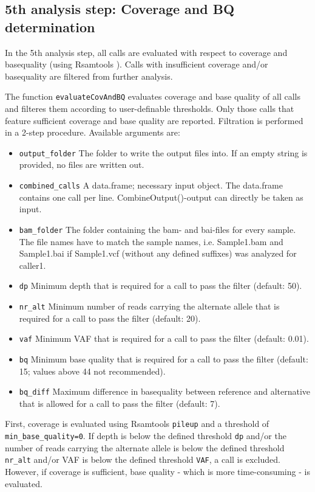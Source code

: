 \documentclass{article}
\begin{document}
\subsection{5th analysis step: Coverage and BQ determination}

In the 5th analysis step, all calls are evaluated with respect to coverage and basequality (using Rsamtools \cite{rsamtools}). Calls with insufficient coverage and/or basequality are filtered from further analysis.

The function \texttt{evaluateCovAndBQ} evaluates coverage and base quality of all calls and filteres them according to user-definable thresholds. Only those calls that feature sufficient coverage and base quality are reported. Filtration is performed in a 2-step procedure. Available arguments are:

\begin{itemize}
  \item \texttt{output\_folder} The folder to write the output files into. If an empty string is provided, no files are written out.
  \item \texttt{combined\_calls} A data.frame; necessary input object. The data.frame contains one call per line. CombineOutput()-output can directly be taken as input.
  \item \texttt{bam\_folder} The folder containing the bam- and bai-files for every sample. The file names have to match the sample names, i.e. Sample1.bam and Sample1.bai if Sample1.vcf (without any defined suffixes) was analyzed for caller1.
  \item \texttt{dp} Minimum depth that is required for a call to pass the filter (default: 50).
  \item \texttt{nr\_alt} Minimum number of reads carrying the alternate allele that is required for a call to pass the filter (default: 20).
  \item \texttt{vaf} Minimum VAF that is required for a call to pass the filter (default: 0.01).
  \item \texttt{bq} Minimum base quality that is required for a call to pass the filter (default: 15; values above 44 not recommended).
  \item \texttt{bq\_diff} Maximum difference in basequality between reference and alternative that is allowed for a call to pass the filter (default: 7).
\end{itemize}

First, coverage is evaluated using Rsamtools \texttt{pileup} and a threshold of \texttt{min\_base\_quality=0}. If depth is below the defined threshold \texttt{dp} and/or the number of reads carrying the alternate allele is below the defined threshold \texttt{nr\_alt} and/or VAF is below the defined threshold \texttt{VAF}, a call is excluded. However, if coverage is sufficient, base quality - which is more time-consuming - is evaluated.
\end{document}
